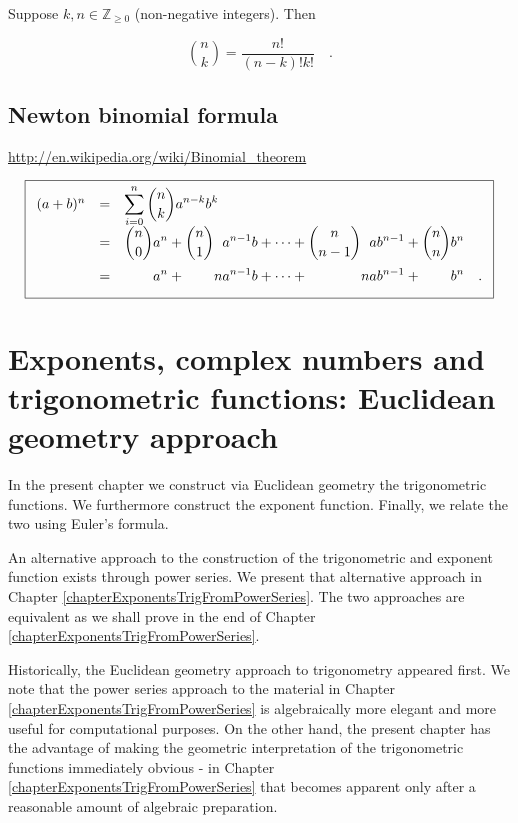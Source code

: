 \documentclass[12pt]{book}
\begin{document}
Suppose $k,n\in \mathbb Z_{\geq 0}$ (non-negative integers). Then

\[\binom{n}{k} = \frac{n!}{(n-k)! k!}\quad .
\]

\section{Newton binomial formula}\label{secNewtonBinomialReview}
\url{http://en.wikipedia.org/wiki/Binomial_theorem}



\begin{equation}\boxed{\label{eqNewtonBinomialFormula}
\begin{array}{rcl}
(a+b)^{n} &=&\displaystyle \sum\limits_{i=0}^n \binom {n}{k} a^{n-k}b^{k} \\
&=&\displaystyle \binom{n}{0} a^n + \binom{n}{1}\phantom{n}a^{n-1}b +\dots+ \binom{n}{n-1} \phantom{n} ab^{n-1} + \binom{n}{n} b^n\\
&=&\displaystyle \phantom{\binom{n}{0}}a^n + \phantom{\binom{n}1} n a^{n-1}b+\dots + \phantom{\binom{n}{n-1}} na b^{n-1}+\phantom{\binom{n}{n}} b^n \quad .
\end{array}
}
\end{equation}

\chapter[Exponents \& trig - Euclidean approach]{Exponents, complex numbers and trigonometric functions: Euclidean geometry approach} \label{chapterExponentsTrigFromEuclideanGeometry}

In the present chapter we construct via Euclidean geometry the trigonometric functions. We furthermore construct the exponent function. Finally, we relate the two using Euler's formula. 

An alternative approach to the construction of the trigonometric and exponent function exists through power series. We present that alternative approach in Chapter \ref{chapterExponentsTrigFromPowerSeries}. The two approaches  are equivalent as we shall prove in the end of Chapter \ref{chapterExponentsTrigFromPowerSeries}. 

Historically, the Euclidean geometry approach to trigonometry appeared first. We note that the power series approach to the material in Chapter \ref{chapterExponentsTrigFromPowerSeries} is algebraically more elegant and more useful for computational purposes. On the other hand, the present chapter has the advantage of making the geometric interpretation of the trigonometric functions immediately obvious - in Chapter \ref{chapterExponentsTrigFromPowerSeries} that becomes apparent only after a reasonable amount of algebraic preparation.
\end{document}
